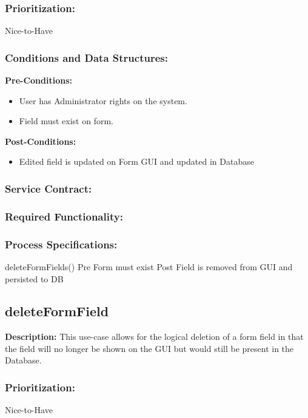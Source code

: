 \subsubsection{Prioritization:}
Nice-to-Have
\subsubsection{Conditions and Data Structures:}
\textbf{Pre-Conditions:}
\begin{itemize}
	\item User has Administrator rights on the system.
	\item Field must exist on form.
\end{itemize}

\textbf{Post-Conditions:}	
\begin{itemize}
	\item Edited field is updated on Form GUI and updated in Database
\end{itemize}
\subsubsection{Service Contract:} 
\subsubsection{Required Functionality:} 
\subsubsection{Process Specifications:} 




deleteFormFields()	
Pre Form must exist	
Post Field is removed from GUI and  persisted to DB

\subsection{deleteFormField}
\textbf{Description:}
This use-case allows for the logical deletion of a form field in that the field will no longer be shown on the GUI but would still be present in the Database.
\subsubsection{Prioritization:}
Nice-to-Have
